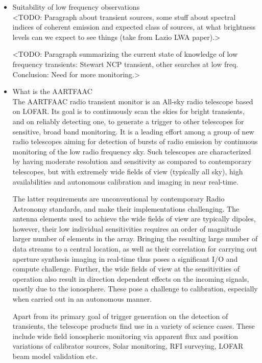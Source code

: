 \documentclass{ws-jai}
\begin{document}
\begin{itemize}
\item Suitability of low frequency observations \\
<TODO: Paragraph about  transient sources, some stuff about  spectral indices of
coherent emission and  expected class of sources, at what  brightness levels can
we expect to see things (take from Lazio LWA paper).>

<TODO: Paragraph  summarizing the  current state of  knowledge of  low frequency
transients: Stewart NCP transient, other  searches at low freq. Conclusion: Need
for more monitoring.>

\item What is the AARTFAAC \\
The AARTFAAC  radio transient  monitor is  an All-sky  radio telescope  based on
LOFAR. Its goal is to continuously scan  the skies for bright transients, and on
reliably detecting one, to generate a trigger to other telescopes for sensitive,
broad  band monitoring.   It is  a leading  effort among  a group  of new  radio
telescopes  aiming for  detection  of  bursts of  radio  emission by  continuous
monitoring of the low radio frequency sky.  Such telescopes are characterized by
having  moderate   resolution  and  sensitivity  as   compared  to  contemporary
telescopes, but  with extremely wide  fields of  view (typically all  sky), high
availabilities and autonomous calibration and imaging in near real-time.

The  latter  requirements are  unconventional  by  contemporary Radio  Astronomy
standards, and make their implementations challenging. The antenna elements used
to achieve  the wide fields  of view are  typically dipoles, however,  their low
individual  sensitivities  requires  an  order of  magnitude  larger  number  of
elements in the array.  Bringing the resulting large number of data streams to a
central  location,  as well  as  their  correlation  for carrying  out  aperture
synthesis  imaging  in  real-time  thus  poses a  significant  I/O  and  compute
challenge. Further,  the wide fields of  view at the sensitivities  of operation
also result in  direction dependent effects on the incoming  signals, mostly due
to  the ionosphere.  These  pose  a challenge  to  calibration, especially  when
carried out in an autonomous manner.

Apart  from  its  primary  goal  of  trigger  generation  on  the  detection  of
transients, the telescope products find use in a variety of science cases. These
include  wide  field  ionospheric  monitoring via  apparent  flux  and  position
variations of  calibrator sources, Solar  monitoring, RFI surveying,  LOFAR beam
model validation etc.


\end{itemize}
\end{document}
